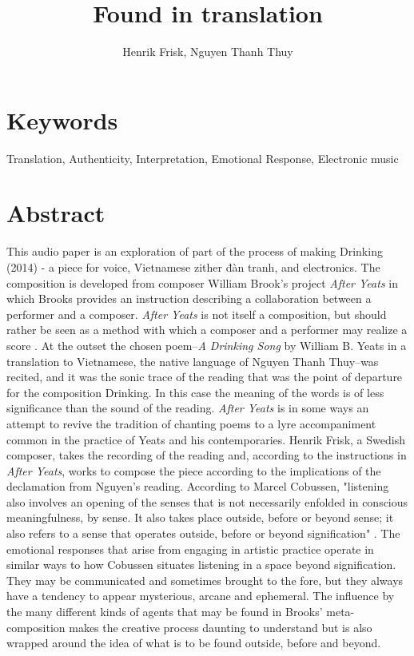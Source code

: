 \documentclass[11pt]{article}
\author{Henrik Frisk, Nguyen Thanh Thuy}
\date{}
\title{Found in translation}
\begin{document}
\maketitle

\section*{Keywords}
\label{sec:org5cf115d}
Translation, Authenticity, Interpretation, Emotional Response, Electronic music

\section*{Abstract}
\label{sec:org6778a59}
This audio paper is an exploration of part of the process of making Drinking (2014) - a piece for voice, Vietnamese zither đàn tranh, and electronics. The composition is developed from composer William Brook’s project \emph{After Yeats} in which Brooks provides an instruction describing a collaboration between a performer and a composer. \emph{After Yeats} is not itself a composition, but should rather be seen as a method with which a composer and a performer may realize a score \citep{Brooks2013}. At the outset the chosen poem--\emph{A Drinking Song} by William B. Yeats in a translation to Vietnamese, the native language of Nguyen Thanh Thuy--was recited, and it was the sonic trace of the reading that was the point of departure for the composition Drinking. In this case the meaning of the words is of less significance than the sound of the reading. \emph{After Yeats} is in some ways an attempt to revive the tradition of chanting poems to a lyre accompaniment common in the practice of Yeats and his contemporaries. Henrik Frisk, a Swedish composer, takes the recording of the reading and, according to the instructions in \emph{After Yeats}, works to compose the piece according to the implications of the declamation from Nguyen's reading. According to Marcel Cobussen, "listening also involves an opening of the senses that is not necessarily enfolded in conscious meaningfulness, by sense. It also takes place outside, before or beyond sense; it also refers to a sense that operates outside, before or beyond signification" \citep[p. 131]{cobussen08}. The emotional responses that arise from engaging in artistic practice operate in similar ways to how Cobussen situates listening in a space beyond signification. They may be communicated and sometimes brought to the fore, but they always have a tendency to appear mysterious, arcane and ephemeral. The influence by the many different kinds of agents that may be found in Brooks’ meta-composition makes the creative process daunting to understand but is also wrapped around the idea of what is to be found outside, before and beyond.

\printbibliography
\end{document}
